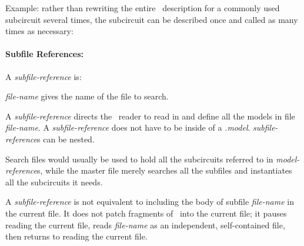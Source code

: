 {\begin{pespace}
Example: rather than rewriting the entire \BLIF\ description for a commonly
used subcircuit several times, the subcircuit can be described once and
called as many times as necessary:
    
\paragraph{Subfile References:}
A {\em subfile-reference} is:

\begin{description}
\item {\em file-name} gives the name of the file to search.
\end{description}

A {\em subfile-reference} directs the \BLIF\ reader to read in and define
all the models in file {\em file-name}.  A {\em subfile-reference} does not
have to be inside of a {\em .model}.  {\em subfile-reference}s can be
nested.  

Search files would usually be used to hold all the subcircuits referred to
in {\em model-reference}s, while the master file merely searches all the
subfiles and instantiates all the subcircuits it needs.

A {\em subfile-reference} is not equivalent to including the body of subfile
{\em file-name} in the current file.  It does not patch fragments of \BLIF\
into the current file; it pauses reading the current file, reads {\em
file-name} as an independent, self-contained file, then returns to reading
the current file.


\end{pespace}}
